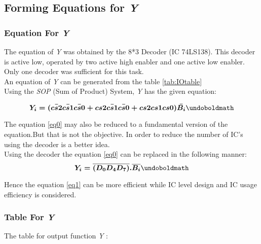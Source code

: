 \documentclass[12pt]{article}
\begin{document}
\renewcommand{\arraystretch}{1}

\subsection{Forming Equations for \textit{Y}}

\subsubsection{Equation For \textit{Y}}


The equation of \textit{Y} was obtained by the 8*3 Decoder (IC 74LS138). This decoder is active low, operated by two active high enabler and one active low enabler. Only one decoder was sufficient for this task.\\

An equation of \textit{Y} can be generated from the table \ref{tab:IOtable}\\

Using the \textit{SOP} (Sum of Product) System, \textit{Y} has the given equation:

\begin{equation}
    \boldmath Y_i = ( \bar{cs2}\bar{cs1}\bar{cs0} + cs2\bar{cs1}\bar{cs0} + cs2cs1cs0 )\bar{B_i}
    \undoboldmath
    \label{eq0}
\end{equation}

The equation \ref{eq0} may also be reduced to a fundamental version of the equation.But that is not the objective. In order to reduce the number of IC's using the decoder is a better idea.\\

Using the decoder the equation \ref{eq0} can be replaced in the following manner:\\

\begin{equation}
   \boldmath Y_i = \overline{(D_0 D_4 D_7)}. \overline{B_i}
  \undoboldmath
    \label{eq1}
\end{equation}

Hence the equation \ref{eq1} can be more efficient while IC level design and IC usage efficiency is considered.\\

\subsubsection{Table For \textit{Y}}

The table for output function \textit{Y} :
\end{document}
